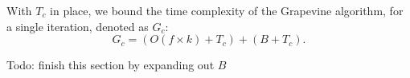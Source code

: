 With $T_c$ in place, we bound the time complexity of the \textsf{Grapevine}
algorithm, for a single iteration, denoted as $G_c$:
\[
G_c = (O(f\times k) + T_c) + (B + T_c).
\]

Todo: finish this section by expanding out $B$



